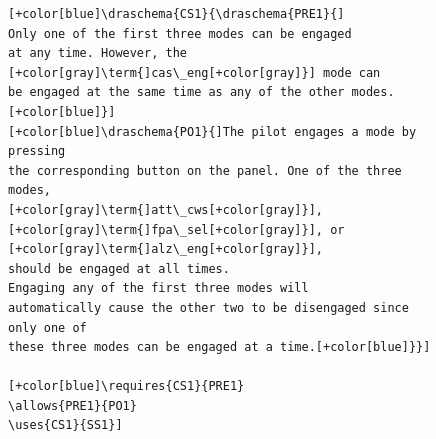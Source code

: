 \begin{figure}[H]
\begin{minipage}{0.45\textwidth}
\begin{tiny}
\begin{BVerbatim}[commandchars=+\[\]]
[+color[blue]\draschema{CS1}{\draschema{PRE1}{]
Only one of the first three modes can be engaged
at any time. However, the [+color[gray]\term{]cas\_eng[+color[gray]}] mode can 
be engaged at the same time as any of the other modes.[+color[blue]}]
[+color[blue]\draschema{PO1}{]The pilot engages a mode by pressing
the corresponding button on the panel. One of the three modes, 
[+color[gray]\term{]att\_cws[+color[gray]}], [+color[gray]\term{]fpa\_sel[+color[gray]}], or [+color[gray]\term{]alz\_eng[+color[gray]}],
should be engaged at all times.
Engaging any of the first three modes will 
automatically cause the other two to be disengaged since only one of 
these three modes can be engaged at a time.[+color[blue]}}] 

[+color[blue]\requires{CS1}{PRE1}
\allows{PRE1}{PO1}
\uses{CS1}{SS1}]
 

\end{BVerbatim}
\end{tiny}
\end{minipage}
\end{figure}
